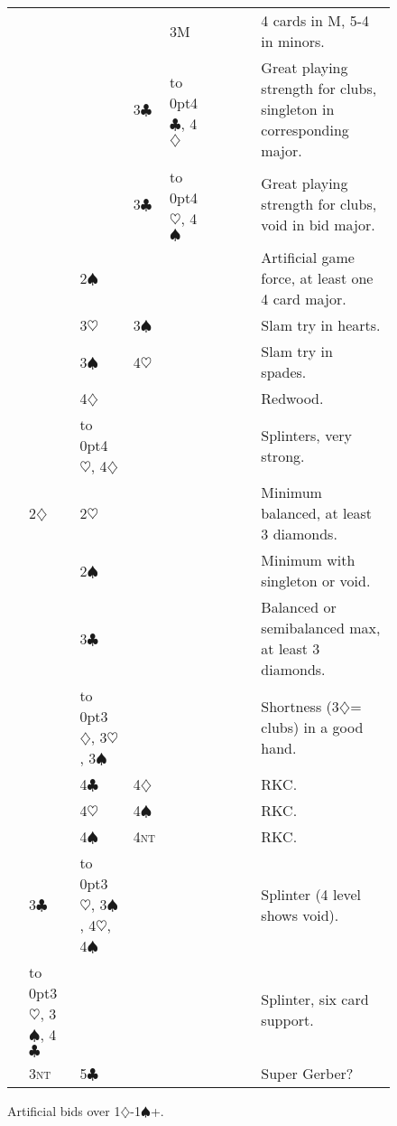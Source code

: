 \documentclass{report}
\renewcommand{\c}{\ensuremath{\clubsuit}}
\renewcommand{\d}{\ensuremath{\diamondsuit}}
\newcommand{\h}{\ensuremath{\heartsuit}}
\newcommand{\s}{\ensuremath{\spadesuit}}
\newcommand{\nt}{\textsc{nt}}
\newcommand{\+}{\ensuremath{^+}}
\begin{document}
\begin{figure}[ht]
\begin{tabular}{ll|ll|ll|ll|l}
& & & & 3M & & & & 4 cards in M, 5-4 in minors. \\
& & & 3\c & \hbox to 0pt{4\c, 4\d} & & & & Great playing strength for clubs, singleton in corresponding major.\\
& & & 3\c & \hbox to 0pt{4\h, 4\s} & & & & Great playing strength for clubs, void in bid major.\\
& & 2\s & & & & & & Artificial game force, at least one 4 card major. \\
& & 3\h & 3\s & & & & & Slam try in hearts. \\
& & 3\s & 4\h & & & & & Slam try in spades. \\
& & 4\d & & & & & & Redwood. \\
& & \hbox to 0pt{4\h, 4\d} & & & & & & Splinters, very strong.\\
& 2\d & 2\h & & & & & & Minimum balanced, at least 3 diamonds. \\
& & 2\s & & & & & & Minimum with singleton or void. \\
& & 3\c & & & & & & Balanced or semibalanced max, at least 3 diamonds. \\
& & \hbox to 0pt{3\d, 3\h, 3\s} & & & & & & Shortness (3\d = clubs) in a good hand.\\
& & 4\c & 4\d & & & & & RKC. \\
& & 4\h & 4\s & & & & & RKC. \\
& & 4\s & 4\nt & & & & & RKC. \\
& 3\c & \hbox to 0pt{3\h, 3\s, 4\h, 4\s} & & & & & & Splinter (4 level shows void). \\
& \hbox to 0pt{3\h, 3\s, 4\c} & & & & & & & Splinter, six card support. \\
& 3\nt & 5\c & & & & & & Super Gerber? \\

\end{tabular}
\caption{Artificial bids over 1\d-1\s+.}
\end{figure}
\end{document}
